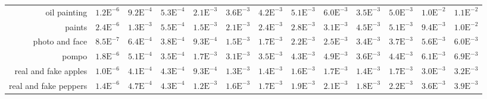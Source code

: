 \begin{landscape}
\begin{table}
\begin{tabularx}{\linewidth}{r | rr | rrrrrr | rrrr}
        oil painting  & \footnotesize{$1.2\mathrm{E}^{-6}$}& \footnotesize{$9.2\mathrm{E}^{-4}$}& \footnotesize{$5.3\mathrm{E}^{-4}$}& \footnotesize{$2.1\mathrm{E}^{-3}$}& \footnotesize{$3.6\mathrm{E}^{-3}$}& \footnotesize{$4.2\mathrm{E}^{-3}$}& \footnotesize{$5.1\mathrm{E}^{-3}$}& \footnotesize{$6.0\mathrm{E}^{-3}$}& \footnotesize{$3.5\mathrm{E}^{-3}$}& \footnotesize{$5.0\mathrm{E}^{-3}$}& \footnotesize{$1.0\mathrm{E}^{-2}$}& \footnotesize{$1.1\mathrm{E}^{-2}$}\\
        paints  & \footnotesize{$2.4\mathrm{E}^{-6}$}& \footnotesize{$1.3\mathrm{E}^{-3}$}& \footnotesize{$5.5\mathrm{E}^{-4}$}& \footnotesize{$1.5\mathrm{E}^{-3}$}& \footnotesize{$2.1\mathrm{E}^{-3}$}& \footnotesize{$2.4\mathrm{E}^{-3}$}& \footnotesize{$2.8\mathrm{E}^{-3}$}& \footnotesize{$3.1\mathrm{E}^{-3}$}& \footnotesize{$4.5\mathrm{E}^{-3}$}& \footnotesize{$5.1\mathrm{E}^{-3}$}& \footnotesize{$9.4\mathrm{E}^{-3}$}& \footnotesize{$1.0\mathrm{E}^{-2}$}\\
        photo and face  & \footnotesize{$8.5\mathrm{E}^{-7}$}& \footnotesize{$6.4\mathrm{E}^{-4}$}& \footnotesize{$3.8\mathrm{E}^{-4}$}& \footnotesize{$9.3\mathrm{E}^{-4}$}& \footnotesize{$1.5\mathrm{E}^{-3}$}& \footnotesize{$1.7\mathrm{E}^{-3}$}& \footnotesize{$2.2\mathrm{E}^{-3}$}& \footnotesize{$2.5\mathrm{E}^{-3}$}& \footnotesize{$3.4\mathrm{E}^{-3}$}& \footnotesize{$3.7\mathrm{E}^{-3}$}& \footnotesize{$5.6\mathrm{E}^{-3}$}& \footnotesize{$6.0\mathrm{E}^{-3}$}\\
        pompo   & \footnotesize{$1.8\mathrm{E}^{-6}$}& \footnotesize{$5.1\mathrm{E}^{-4}$}& \footnotesize{$3.5\mathrm{E}^{-4}$}& \footnotesize{$1.7\mathrm{E}^{-3}$}& \footnotesize{$3.1\mathrm{E}^{-3}$}& \footnotesize{$3.5\mathrm{E}^{-3}$}& \footnotesize{$4.3\mathrm{E}^{-3}$}& \footnotesize{$4.9\mathrm{E}^{-3}$}& \footnotesize{$3.6\mathrm{E}^{-3}$}& \footnotesize{$4.4\mathrm{E}^{-3}$}& \footnotesize{$6.1\mathrm{E}^{-3}$}& \footnotesize{$6.9\mathrm{E}^{-3}$}\\
        real and fake apples  & \footnotesize{$1.0\mathrm{E}^{-6}$}& \footnotesize{$4.1\mathrm{E}^{-4}$}& \footnotesize{$4.3\mathrm{E}^{-4}$}& \footnotesize{$9.3\mathrm{E}^{-4}$}& \footnotesize{$1.3\mathrm{E}^{-3}$}& \footnotesize{$1.4\mathrm{E}^{-3}$}& \footnotesize{$1.6\mathrm{E}^{-3}$}& \footnotesize{$1.7\mathrm{E}^{-3}$}& \footnotesize{$1.4\mathrm{E}^{-3}$}& \footnotesize{$1.7\mathrm{E}^{-3}$}& \footnotesize{$3.0\mathrm{E}^{-3}$}& \footnotesize{$3.2\mathrm{E}^{-3}$}\\
        real and fake peppers  & \footnotesize{$1.4\mathrm{E}^{-6}$}& \footnotesize{$4.7\mathrm{E}^{-4}$}& \footnotesize{$4.3\mathrm{E}^{-4}$}& \footnotesize{$1.2\mathrm{E}^{-3}$}& \footnotesize{$1.6\mathrm{E}^{-3}$}& \footnotesize{$1.7\mathrm{E}^{-3}$}& \footnotesize{$1.9\mathrm{E}^{-3}$}& \footnotesize{$2.1\mathrm{E}^{-3}$}& \footnotesize{$1.8\mathrm{E}^{-3}$}& \footnotesize{$2.2\mathrm{E}^{-3}$}& \footnotesize{$3.6\mathrm{E}^{-3}$}& \footnotesize{$3.9\mathrm{E}^{-3}$}\\

\end{tabularx}
\end{table}
\end{landscape}
